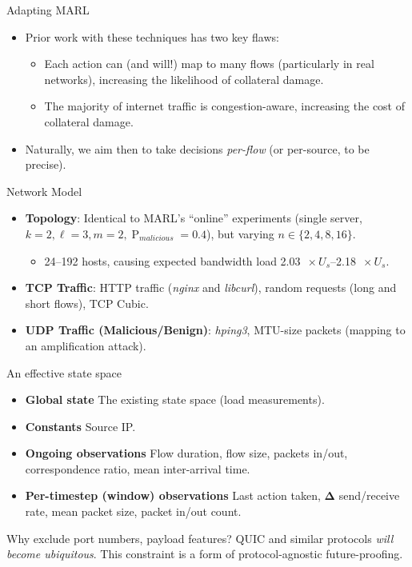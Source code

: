 \documentclass[aspectratio=169,xcolor={dvipsnames}
,hide notes
]{beamer}
\begin{document}
\begin{frame}{Adapting MARL}
\begin{itemize}
	\item Prior work with these techniques has two key flaws:
	\begin{itemize}
		\item Each action can (and will!) map to many flows (particularly in real networks), increasing the \alert{likelihood} of collateral damage.
		\item The majority of internet traffic is congestion-aware, increasing the \alert{cost} of collateral damage.
	\end{itemize}
	\item Naturally, we aim then to take decisions \emph{per-flow} (or per-source, to be precise).
\end{itemize}
\end{frame}

\begin{frame}{Network Model}
\begin{itemize}
	\item \textbf{Topology}: Identical to MARL's ``online'' experiments (single server, $k=2, \ell=3, m=2, \operatorname{P}_{\mathit{malicious}}=0.4$), but varying $n \in \{2, 4, 8, 16\}$.
	\begin{itemize}
		\item \numrange{24}{192} hosts, causing expected bandwidth load \SIrange{2.03}{2.18}{$\! \times U_s$}.
	\end{itemize}
	\item \textbf{TCP Traffic}: HTTP traffic (\emph{nginx} and \emph{libcurl}), random requests (long and short flows), TCP Cubic.
	\item \textbf{UDP Traffic (Malicious/Benign)}: \emph{hping3}, MTU-size packets (mapping to an amplification attack).
\end{itemize}
\end{frame}

\begin{frame}{An effective state space}
\begin{itemize}
	\item \textbf{Global state} The existing state space (load measurements).
	\item \textbf{Constants} Source IP.
	\item \textbf{Ongoing observations} Flow duration, flow size, packets in/out, correspondence ratio, mean inter-arrival time.
	\item \textbf{Per-timestep (window) observations} Last action taken, $\mathbf{\Delta}$ send/receive rate, mean packet size, packet in/out count.
\end{itemize}

	Why exclude port numbers, payload features? \alert{QUIC} and similar protocols \emph{will become ubiquitous}. \alert{This constraint is a form of protocol-agnostic future-proofing}.

\end{frame}
\end{document}
